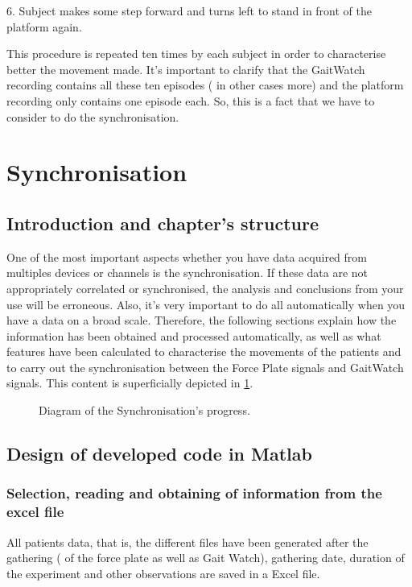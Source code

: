 6.	Subject makes some step  forward and turns left to stand in front of the platform again.

This procedure is repeated ten times by each subject in order to characterise better the movement made.
It’s important to clarify that the GaitWatch recording contains all these ten episodes ( in other cases more) and the platform recording only contains one episode each. So, this is a fact that we have to consider to do the synchronisation.

\section{Synchronisation}

\subsection{Introduction and chapter's structure}
One of the most important aspects whether you have data acquired from multiples devices or channels is the synchronisation. If these data are not appropriately correlated or synchronised, the analysis and conclusions from your use will be erroneous. Also, it’s very important to do all automatically when you have a data on a broad scale.
Therefore, the following sections explain how the information has been obtained and processed automatically, as well as what features have been calculated to characterise the movements of the patients and to carry out the synchronisation between the Force Plate signals and GaitWatch signals. This content is superficially depicted in \ref{fig:diagramSynchronisation}.

\begin{figure}[H]
	\centering
	\caption{Diagram of the Synchronisation's progress.}
	\label{fig:diagramSynchronisation}
\end{figure}

\subsection{Design of developed code  in Matlab}
\subsubsection{Selection, reading and obtaining of information from the excel file}
All patients data, that is, the different files have been generated after the gathering (  of the force plate as well as Gait Watch), gathering date, duration of the experiment and other observations are saved in a Excel file. 

